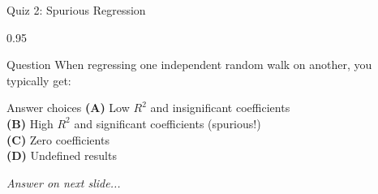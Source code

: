 \documentclass[9pt, aspectratio=169, t]{beamer}
\begin{document}
\begin{frame}{Quiz 2: Spurious Regression}
    \begin{cminipage}{0.95\textwidth}
    \begin{alertblock}{Question}
        When regressing one independent random walk on another, you typically get:
    \end{alertblock}

    \vspace{0.4cm}

    \begin{block}{Answer choices}
        \textcolor{MainBlue}{\textbf{(A)}} Low $R^2$ and insignificant coefficients\\[3pt]
        \textcolor{MainBlue}{\textbf{(B)}} High $R^2$ and significant coefficients (spurious!)\\[3pt]
        \textcolor{MainBlue}{\textbf{(C)}} Zero coefficients\\[3pt]
        \textcolor{MainBlue}{\textbf{(D)}} Undefined results
    \end{block}

    \vspace{0.5cm}

    \begin{center}
        \textit{Answer on next slide...}
    \end{center}
    \end{cminipage}
\end{frame}
\end{document}
